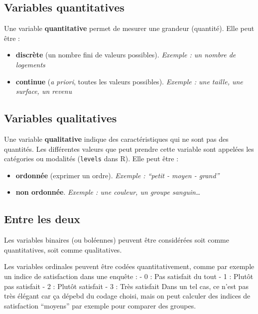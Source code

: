 \documentclass[]{book}
\begin{document}
\hypertarget{variables-quantitatives}{%
\subsection{Variables quantitatives}\label{variables-quantitatives}}

Une variable \textbf{quantitative} permet de mesurer une grandeur (quantité). Elle peut être :

\begin{itemize}
\item
  \textbf{discrète} (un nombre fini de valeurs possibles). \emph{Exemple : un nombre de logements}
\item
  \textbf{continue} (\emph{a priori}, toutes les valeurs possibles). \emph{Exemple : une taille, une surface, un revenu}
\end{itemize}

\hypertarget{variables-qualitatives}{%
\subsection{Variables qualitatives}\label{variables-qualitatives}}

Une variable \textbf{qualitative} indique des caractéristiques qui ne sont pas des quantités. Les différentes valeurs que peut prendre cette variable sont appelées les catégories ou modalités (\texttt{levels} dans R). Elle peut être :

\begin{itemize}
\item
  \textbf{ordonnée} (exprimer un ordre). \emph{Exemple : ``petit - moyen - grand''}
\item
  \textbf{non ordonnée}. \emph{Exemple : une couleur, un groupe sanguin\ldots{}}
\end{itemize}

\hypertarget{entre-les-deux}{%
\subsection{Entre les deux}\label{entre-les-deux}}

Les variables binaires (ou boléennes) peuvent être considérées soit comme quantitatives, soit comme qualitatives.

Les variables ordinales peuvent être codées quantitativement, comme par exemple un indice de satisfaction dans une enquête :
- 0 : Pas satisfait du tout
- 1 : Plutôt pas satisfait
- 2 : Plutôt satisfait
- 3 : Très satisfait
Dans un tel cas, ce n'est pas très élégant car ça dépebd du codage choisi, mais on peut calculer des indices de satisfaction ``moyens'' par exemple pour comparer des groupes.
\end{document}
